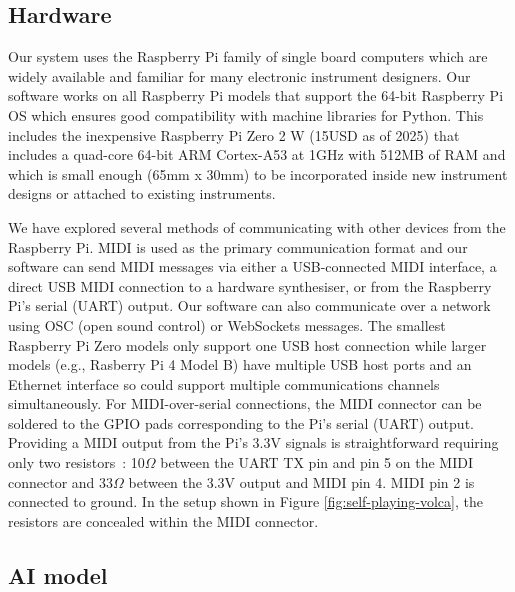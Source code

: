 \documentclass[manuscript,review,anonymous]{acmart}
\begin{document}
\subsection{Hardware}

Our system uses the Raspberry Pi family of single board computers which are widely available and familiar for many electronic instrument designers. Our software works on all Raspberry Pi models that support the 64-bit Raspberry Pi OS which ensures good compatibility with machine libraries for Python. This includes the inexpensive Raspberry Pi Zero 2 W (15USD as of 2025) that includes a quad-core 64-bit ARM Cortex-A53 at 1GHz with 512MB of RAM and which is small enough (65mm x 30mm) to be incorporated inside new instrument designs or attached to existing instruments.

We have explored several methods of communicating with other devices from the Raspberry Pi. MIDI is used as the primary communication format and our software can send MIDI messages via either a USB-connected MIDI interface, a direct USB MIDI connection to a hardware synthesiser, or from the Raspberry Pi's serial (UART) output. Our software can also communicate over a network using OSC (open sound control) or WebSockets messages. The smallest Raspberry Pi Zero models only support one USB host connection while larger models (e.g., Rasberry Pi 4 Model B) have multiple USB host ports and an Ethernet interface so could support multiple communications channels simultaneously.
For MIDI-over-serial connections, the MIDI connector can be soldered to the GPIO pads corresponding to the Pi's serial (UART) output. 
Providing a MIDI output from the Pi's 3.3V signals is straightforward requiring only two resistors~\cite{MIDI-Manufacturers-Association:2014aa}: 10$\Omega$ between the UART TX pin and pin 5 on the MIDI connector and 33$\Omega$ between the 3.3V output and MIDI pin 4. 
MIDI pin 2 is connected to ground. 
In the setup shown in Figure \ref{fig:self-playing-volca}, the resistors are concealed within the MIDI connector.


\subsection{AI model}
\end{document}
